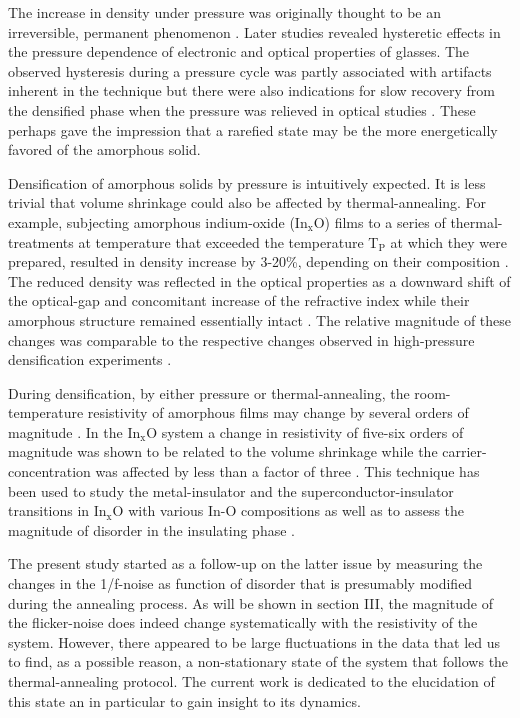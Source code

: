 \documentclass
[preprint,showpacs,byrevtex,10pt,twocolumn,tightenlines,prl,letterpaper]{revtex4}%
\begin{document}
The increase in density under pressure was originally thought to be an
irreversible, permanent phenomenon \cite{2}. Later studies revealed hysteretic
effects in the pressure dependence of electronic \cite{6} and optical \cite{1}
properties of glasses. The observed hysteresis during a pressure cycle was
partly associated with artifacts inherent in the technique \cite{6} but there
were also indications for slow recovery from the densified phase when the
pressure was relieved in optical studies \cite{7}. These perhaps gave the
impression that a rarefied state may be the more energetically favored of the
amorphous solid.

Densification of amorphous solids by pressure is intuitively expected. It is
less trivial that volume shrinkage could also be affected by
thermal-annealing. For example, subjecting amorphous indium-oxide
(In$_{\text{x}}$O) films to a series of thermal-treatments at temperature that
exceeded the temperature T$_{\text{P}}$ at which they were prepared, resulted
in density increase by 3-20\%, depending on their composition \cite{14}. The
reduced density was reflected in the optical properties as a downward shift of
the optical-gap and concomitant increase of the refractive index while their
amorphous structure remained essentially intact \cite{14}. The relative
magnitude of these changes was comparable to the respective changes observed
in high-pressure densification experiments \cite{1,2}.

During densification, by either pressure or thermal-annealing, the
room-temperature resistivity of amorphous films may change by several orders
of magnitude \cite{6}. In the In$_{\text{x}}$O system a change in resistivity
of five-six orders of magnitude was shown to be related to the volume
shrinkage while the carrier-concentration was affected by less than a factor
of three \cite{15}. This technique has been used to study the metal-insulator
and the superconductor-insulator transitions in In$_{\text{x}}$O with various
In-O compositions \cite{16} as well as to assess the magnitude of disorder in
the insulating phase \cite{14}.

The present study started as a follow-up on the latter issue by measuring the
changes in the 1/f-noise as function of disorder that is presumably modified
during the annealing process. As will be shown in section III, the magnitude
of the flicker-noise does indeed change systematically with the resistivity of
the system. However, there appeared to be large fluctuations in the data that
led us to find, as a possible reason, a non-stationary state of the system
that follows the thermal-annealing protocol. The current work is dedicated to
the elucidation of this state an in particular to gain insight to its dynamics.
\end{document}
